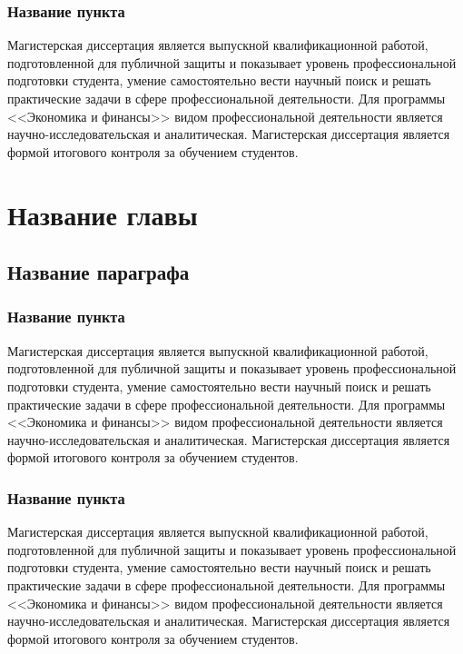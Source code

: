 \documentclass[12pt,a4paper, oneside]{extreport}
\begin{document}
\subsection{Название пункта}

Магистерская диссертация является выпускной квалификационной работой, подготовленной для публичной защиты и показывает уровень профессиональной подготовки студента, умение самостоятельно вести научный поиск и решать практические задачи в сфере профессиональной деятельности. Для программы <<Экономика и финансы>> видом профессиональной деятельности является научно-исследовательская и аналитическая. Магистерская диссертация является формой итогового контроля за обучением студентов.



\chapter{Название главы}

\section{Название параграфа}

\subsection{Название пункта}

Магистерская диссертация является выпускной квалификационной работой, подготовленной для публичной защиты и показывает уровень профессиональной подготовки студента, умение самостоятельно вести научный поиск и решать практические задачи в сфере профессиональной деятельности. Для программы <<Экономика и финансы>> видом профессиональной деятельности является научно-исследовательская и аналитическая. Магистерская диссертация является формой итогового контроля за обучением студентов.

\subsection{Название пункта}

Магистерская диссертация является выпускной квалификационной работой, подготовленной для публичной защиты и показывает уровень профессиональной подготовки студента, умение самостоятельно вести научный поиск и решать практические задачи в сфере профессиональной деятельности. Для программы <<Экономика и финансы>> видом профессиональной деятельности является научно-исследовательская и аналитическая. Магистерская диссертация является формой итогового контроля за обучением студентов.
\end{document}
